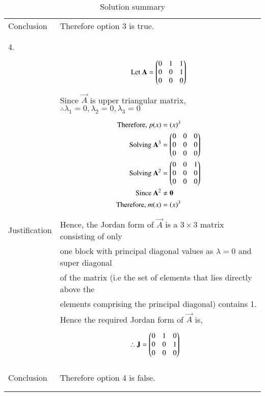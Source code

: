 \documentclass[journal,12pt]{IEEEtran}
\begin{document}
\begin{longtable}{|l|l|}
Conclusion&Therefore option 3 is true.\\
&\\
\hline
\pagebreak
\hline
&\\
4.&\\
&\parbox{6cm}{\begin{align*}
    \mbox{Let }\mathbf{A}&=\begin{pmatrix}0&1&1\\0&0&1\\0&0&0\end{pmatrix}\\
\end{align*}}\\
&Since $\vec{A}$ is upper triangular matrix, $\therefore \lambda_{1}=0,\lambda_{2}=0,\lambda_{3}=0$ \\
&\parbox{6cm}{\begin{align*}
    \mbox{Therefore, }p(x)&=(x)^3\\
    \mbox{Solving }\mathbf{A}^3&=\begin{pmatrix}0&0&0\\0&0&0\\0&0&0\end{pmatrix}\\
    \mbox{Solving }\mathbf{A}^2&=\begin{pmatrix}0&0&1\\0&0&0\\0&0&0\end{pmatrix}\\
    \mbox{Since }\mathbf{A}^2&\neq \mathbf{0}\\
    \mbox{Therefore, }m(x)&=(x)^3\\
    \end{align*}}\\
Justification&Hence, the Jordan form of $\vec{A}$ is a $3 \times 3$ matrix consisting of only\\
&one block with principal diagonal values as $\lambda = 0$ and super diagonal\\
&of the matrix (i.e the set of elements that lies directly above the\\
&elements comprising the principal diagonal) contains 1.\\
&Hence the required Jordan form of $\vec{A}$ is,\\
&\parbox{6cm}{\begin{align*}
    \therefore \mathbf{J}&=\begin{pmatrix}0&1&0\\0&0&1\\0&0&0\end{pmatrix}
\end{align*}}\\
&\\
\hline
&\\
Conclusion&Therefore option 4 is false.\\
&\\
\hline
\caption{Solution summary}
\label{table:2}
\end{longtable}
\end{document}

